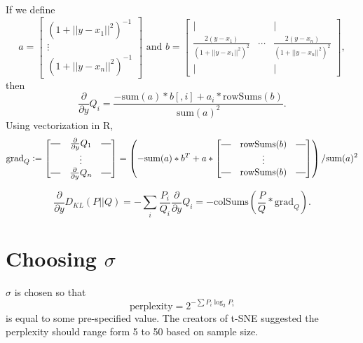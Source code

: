 \documentclass{article}
\newcommand{\partialy}{{\frac{\partial}{\partial y}}}
\newcommand{\horzbar}{\rule[.5ex]{2.5ex}{0.5pt}}
\begin{document}
If we define $$a = \begin{bmatrix}
(1 + ||y-x_1||^2)^{-1} \\
\vdots \\
(1 + ||y-x_n||^2)^{-1}
\end{bmatrix} \textrm{ and }
b = \begin{bmatrix}
\vert & & \vert \\
\frac{2(y-x_1)}{(1+||y-x_1||^2)^2} & \cdots & \frac{2(y-x_n)}{(1+||y-x_n||^2)^2} \\
\vert & & \vert 
\end{bmatrix},$$ 
then $$\partialy Q_i = \frac{-\textrm{sum}(a)*b[,i] + a_i*\textrm{rowSums}(b)}{\textrm{sum}(a)^2}.$$ Using vectorization in R, $$\textrm{grad}_Q \vcentcolon = \begin{bmatrix}
\horzbar & \partialy Q_1 & \horzbar \\
& \vdots & \\
\horzbar & \partialy Q_n & \horzbar 
\end{bmatrix} = 
\left(-\textrm{sum}(a)*b^T + a*\begin{bmatrix}
\horzbar & \textrm{rowSums}(b) & \horzbar \\
& \vdots & \\
\horzbar & \textrm{rowSums}(b) & \horzbar \end{bmatrix} \right) / \textrm{sum}(a)^2$$

$$\partialy D_{KL}(P || Q) = -\sum_i \frac{P_i}{Q_i} \partialy Q_i = -\textrm{colSums}\left( \frac{P}{Q} * \textrm{grad}_Q \right).$$

\section{Choosing $\sigma$}
$\sigma$ is chosen so that $$\textrm{perplexity} = 2^{-\sum P_i \log_2 P_i}$$ is equal to some pre-specified value. The creators of t-SNE suggested the perplexity should range form 5 to 50 based on sample size.
\end{document}
